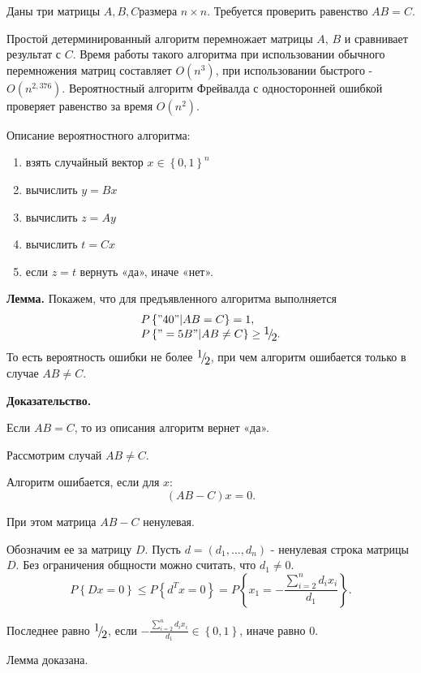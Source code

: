 \begin{problem}

Даны три матрицы $A,B,C$размера $n\times n$. Требуется проверить равенство $AB=C$.

Простой детерминированный алгоритм перемножает матрицы $A$, $B$ и сравнивает результат с $C$. Время работы такого алгоритма при использовании обычного перемножения матриц составляет $O(n^{3} )$, при использовании быстрого - $O(n^{2,376} )$. Вероятностный алгоритм Фрейвалда с односторонней ошибкой проверяет равенство за время $O(n^{2} )$.

Описание вероятностного алгоритма:

\begin{enumerate}
\item \textbf{ }взять случайный вектор $x\in \left\{0,1\right\}^{n} $

\item  вычислить $y=Bx$

\item  вычислить $z=Ay$

\item  вычислить $t=Cx$

\item  если $z=t$ вернуть «да», иначе «нет».
\end{enumerate}

\textbf{Лемма.} Покажем, что для предъявленного алгоритма выполняется 
\[\begin{array}{l} {P\left\{"40"|AB=C\right\}=1,} \\ {P\left\{"=5B"|AB\ne C\right\}\ge {\raise0.7ex\hbox{$ 1 $}\!\mathord{\left/ {\vphantom {1 2}} \right. \kern-\nulldelimiterspace}\!\lower0.7ex\hbox{$ 2 $}} .} \end{array}\] 
То есть вероятность ошибки не более ${\raise0.7ex\hbox{$ 1 $}\!\mathord{\left/ {\vphantom {1 2}} \right. \kern-\nulldelimiterspace}\!\lower0.7ex\hbox{$ 2 $}} $, при чем алгоритм ошибается только в случае $AB\ne C$.

\textbf{Доказательство.}

Если $AB=C$, то из описания алгоритм вернет «да».

Рассмотрим случай $AB\ne C$.

Алгоритм ошибается, если для $x$:
\[\left(AB-C\right)x=0.\] 

При этом матрица $AB-C$ ненулевая. 

Обозначим ее за матрицу $D$. Пусть $d=\left(d_{1} ,...,d_{n} \right)$ - ненулевая строка матрицы $D$. Без ограничения общности можно считать, что $d_{1} \ne 0$.
\[P\left\{Dx=0\right\}\le P\left\{d^{T} x=0\right\}=P\left\{x_{1} =-\frac{\sum _{i=2}^{n}d_{i} x_{i}  }{d_{1} } \right\}.\] 

Последнее равно ${\raise0.7ex\hbox{$ 1 $}\!\mathord{\left/ {\vphantom {1 2}} \right. \kern-\nulldelimiterspace}\!\lower0.7ex\hbox{$ 2 $}} $, если $-\frac{\sum _{i=2}^{n}d_{i} x_{i}  }{d_{1} } \in \left\{0,1\right\}$, иначе равно $0$.

Лемма доказана.

\end{problem}

